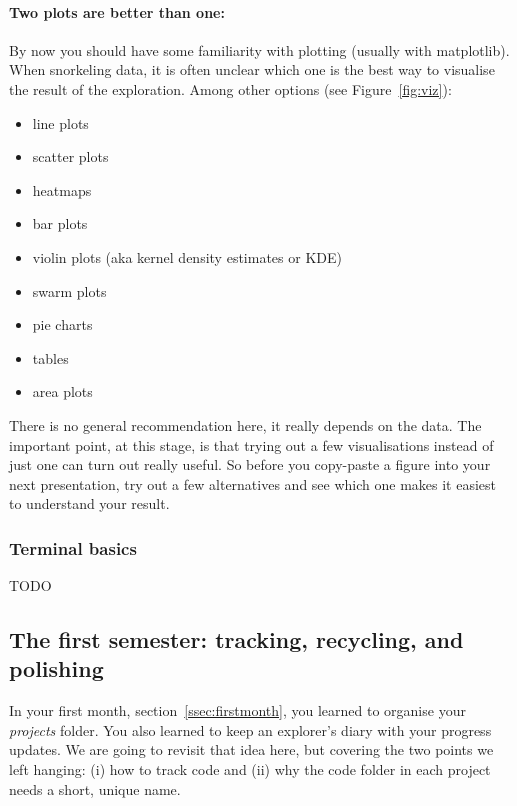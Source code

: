 \documentclass[12pt,a4paper,notitlepage,onecolumn]{article}
\begin{document}
\paragraph{Two plots are better than one:} By now you should have some familiarity with plotting (usually with matplotlib). When snorkeling data, it is often unclear which one is the best way to visualise the result of the exploration. Among other options (see Figure~\ref{fig:viz}):

\begin{itemize}
\item line plots
\item scatter plots
\item heatmaps
\item bar plots
\item violin plots (aka kernel density estimates or KDE)
\item swarm plots
\item pie charts
\item tables
\item area plots
\end{itemize}

There is no general recommendation here, it really depends on the data. The important point, at this stage, is that trying out a few visualisations instead of just one can turn out really useful. So before you copy-paste a figure into your next presentation, try out a few alternatives and see which one makes it easiest to understand your result.

\subsubsection{Terminal basics}
TODO


\subsection{The first semester: tracking, recycling, and polishing}
In your first month, section~\ref{ssec:firstmonth}, you learned to organise your \textit{projects} folder. You also learned to keep an explorer's diary with your progress updates. We are going to revisit that idea here, but covering the two points we left hanging: (i) how to track code and (ii) why the code folder in each project needs a short, unique name.
\end{document}
